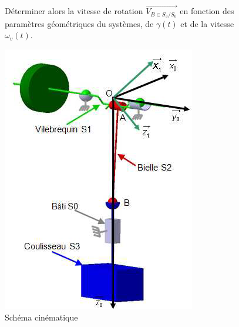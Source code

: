 \begin{figure}[htbp]
\begin{minipage}[c]{.55\linewidth}
Déterminer alors la vitesse de rotation $\overrightarrow{V_{B \in S_3/S_0}}$ en fonction des paramètres géométriques du systèmes, de $\gamma(t)$ et de la vitesse $\omega_v(t)$.
\end{minipage}
\hfill
\begin{minipage}[c]{.4\linewidth}
\begin{center}
\includegraphics[width=\linewidth]{img/Poinc_cin.png}
\caption{Schéma cinématique}
\label{fig:image19}
\end{center}
\end{minipage}
\end{figure}


